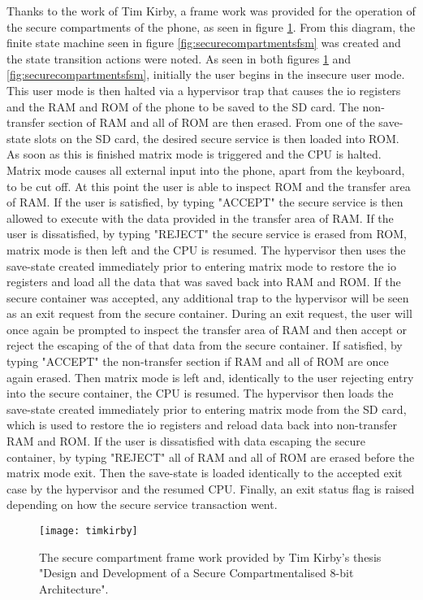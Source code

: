 Thanks to the work of Tim Kirby, a frame work was provided for the operation of the secure compartments of the phone, as seen in figure \ref{fig:timkirby}. From this diagram, the finite state machine seen in figure \ref{fig:securecompartmentsfsm} was created and the state transition actions were noted. As seen in both figures \ref{fig:timkirby} and \ref{fig:securecompartmentsfsm}, initially the user begins in the insecure user mode. This user mode is then halted via a hypervisor trap that causes the io registers and the RAM and ROM of the phone to be saved to the SD card. The non-transfer section of RAM and all of ROM are then erased. From one of the save-state slots on the SD card, the desired secure service is then loaded into ROM. As soon as this is finished matrix mode is triggered and the CPU is halted. Matrix mode causes all external input into the phone, apart from the keyboard, to be cut off. At this point the user is able to inspect ROM and the transfer area of RAM. If the user is satisfied, by typing "ACCEPT" the secure service is then allowed to execute with the data provided in the transfer area of RAM. If the user is dissatisfied, by typing "REJECT" the secure service is erased from ROM, matrix mode is then left and the CPU is resumed. The hypervisor then uses the save-state created immediately prior to entering matrix mode to restore the io registers and load all the data that was saved back into RAM and ROM. If the secure container was accepted, any additional trap to the hypervisor will be seen as an exit request from the secure container. During an exit request, the user will once again be prompted to inspect the transfer area of RAM and then accept or reject the escaping of the of that data from the secure container. If satisfied, by typing "ACCEPT" the non-transfer section if RAM and all of ROM are once again erased. Then matrix mode is left and, identically to the user rejecting entry into the secure container, the CPU is resumed. The hypervisor then loads the save-state created immediately prior to entering matrix mode from the SD card, which is used to restore the io registers and reload data back into non-transfer RAM and ROM. If the user is dissatisfied with data escaping the secure container, by typing "REJECT" all of RAM and all of ROM are erased before the matrix mode exit. Then the save-state is loaded identically to the accepted exit case by the hypervisor and the resumed CPU. Finally, an exit status flag is raised depending on how the secure service transaction went.

\begin{figure}
  \centering
  \texttt{[image: timkirby]}
  \caption{The secure compartment frame work provided by Tim Kirby's thesis "Design and Development of a Secure Compartmentalised 8-bit Architecture".}
  \label{fig:timkirby}
\end{figure}

